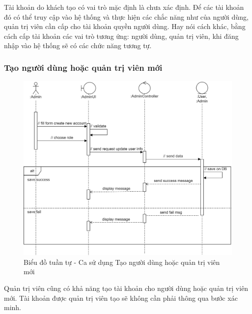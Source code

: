 \documentclass[./../main.tex]{subfiles}
\begin{document}
Tài khoản do khách tạo có vai trò mặc định là chưa xác định. Để các tài khoản đó có thể truy cập vào hệ thống và thực hiện các chắc năng như của người dùng, quản trị viên cần cấp cho tài khoản quyền người dùng. Hay nói cách khác, bằng cách cấp tài khoản các vai trò tương ứng: người dùng, quản trị viên, khi đăng nhập vào hệ thống sẽ có các chức năng tương tự.

\subsubsection{Tạo người dùng hoặc quản trị viên mới}
\begin{figure}[H]
	\centering
	\includegraphics[width=\linewidth]{./img/uc21.png}
	\caption{Biểu đồ tuần tự - Ca sử dụng Tạo người dùng hoặc quản trị viên mới}
\end{figure}

Quản trị viên cũng có khả năng tạo tài khoản cho người dùng hoặc quản trị viên mới. Tài khoản được quản trị viên tạo sẽ không cần phải thông qua bước xác minh.
\end{document}
